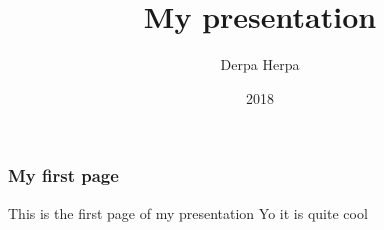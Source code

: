 \documentclass{beamer}
\title{My presentation}
\author{Derpa Herpa}
\institute{Tobii}
\date{2018}
\begin{document}
\frame{\titlepage}

\begin{frame}
\frametitle{My first page}
This is the first page of my presentation \pause
Yo it is quite cool
\end{frame}
\end{document}

